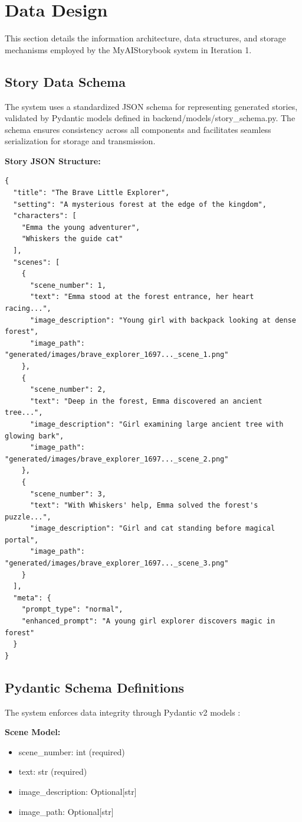 \section{Data Design}
This section details the information architecture, data structures, and storage mechanisms employed by the MyAIStorybook system in Iteration 1.

\subsection{Story Data Schema}
The system uses a standardized JSON schema for representing generated stories, validated by Pydantic models defined in backend/models/story\_schema.py. The schema ensures consistency across all components and facilitates seamless serialization for storage and transmission.

\textbf{Story JSON Structure:}
\begin{verbatim}
{
  "title": "The Brave Little Explorer",
  "setting": "A mysterious forest at the edge of the kingdom",
  "characters": [
    "Emma the young adventurer",
    "Whiskers the guide cat"
  ],
  "scenes": [
    {
      "scene_number": 1,
      "text": "Emma stood at the forest entrance, her heart racing...",
      "image_description": "Young girl with backpack looking at dense forest",
      "image_path": "generated/images/brave_explorer_1697..._scene_1.png"
    },
    {
      "scene_number": 2,
      "text": "Deep in the forest, Emma discovered an ancient tree...",
      "image_description": "Girl examining large ancient tree with glowing bark",
      "image_path": "generated/images/brave_explorer_1697..._scene_2.png"
    },
    {
      "scene_number": 3,
      "text": "With Whiskers' help, Emma solved the forest's puzzle...",
      "image_description": "Girl and cat standing before magical portal",
      "image_path": "generated/images/brave_explorer_1697..._scene_3.png"
    }
  ],
  "meta": {
    "prompt_type": "normal",
    "enhanced_prompt": "A young girl explorer discovers magic in forest"
  }
}
\end{verbatim}

\subsection{Pydantic Schema Definitions}
The system enforces data integrity through Pydantic v2 models \cite{pydantic2024}:

\textbf{Scene Model:}
\begin{itemize}
    \item scene\_number: int (required)
    \item text: str (required)
    \item image\_description: Optional[str]
    \item image\_path: Optional[str]
\end{itemize}

